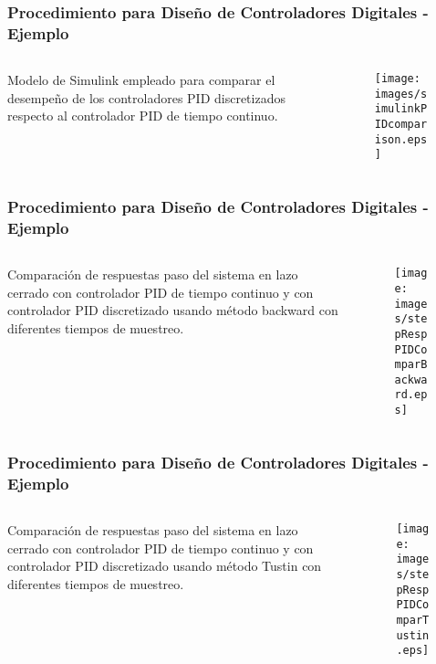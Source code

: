 \documentclass[aspectratio=169]{beamer}
\theoremstyle{definition}
\theoremstyle{plain}
\theoremstyle{remark}
\begin{document}
\begin{frame}[c]\frametitle{Procedimiento para Diseño de Controladores Digitales - Ejemplo}
	\begin{columns}
		\begin{column}{0.3\textwidth}
			Modelo de Simulink empleado para comparar el desempeño de los controladores PID discretizados respecto al controlador PID de tiempo continuo.
		\end{column}
		\begin{column}{0.7\textwidth}
		\begin{figure}
			\centering
			\texttt{[image: images/simulinkPIDcomparison.eps]}
		\end{figure}
		\end{column}
	\end{columns}
\end{frame}

\begin{frame}[c]\frametitle{Procedimiento para Diseño de Controladores Digitales - Ejemplo}
	\begin{columns}
		\begin{column}{0.3\textwidth}
			Comparación de respuestas paso del sistema en lazo cerrado con controlador PID de tiempo continuo y con controlador PID discretizado usando método backward con diferentes tiempos de muestreo.
		\end{column}
		\begin{column}{0.7\textwidth}
		\begin{figure}
			\centering
			\texttt{[image: images/stepRespPIDComparBackward.eps]}
		\end{figure}
		\end{column}
	\end{columns}
\end{frame}

\begin{frame}[c]\frametitle{Procedimiento para Diseño de Controladores Digitales - Ejemplo}
	\begin{columns}
		\begin{column}{0.3\textwidth}
			Comparación de respuestas paso del sistema en lazo cerrado con controlador PID de tiempo continuo y con controlador PID discretizado usando método Tustin con diferentes tiempos de muestreo.
		\end{column}
		\begin{column}{0.7\textwidth}
		\begin{figure}
			\centering
			\texttt{[image: images/stepRespPIDComparTustin.eps]}
		\end{figure}
		\end{column}
	\end{columns}
\end{frame}
\end{document}
